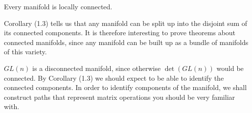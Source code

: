 \begin{corollary}
    Every manifold is locally connected.
\end{corollary}

Corollary (1.3) tells us that any manifold can be split up into the disjoint sum of its connected components. It is therefore interesting to prove theorems about connected manifolds, since any manifold can be built up as a bundle of manifolds of this variety.

\begin{example}
    $GL(n)$ is a disconnected manifold, since otherwise $\det(GL(n))$ would be connected. By Corollary (1.3) we should expect to be able to identify the connected components. In order to identify components of the manifold, we shall construct paths that represent matrix operations you should be very familiar with.


\end{example}

